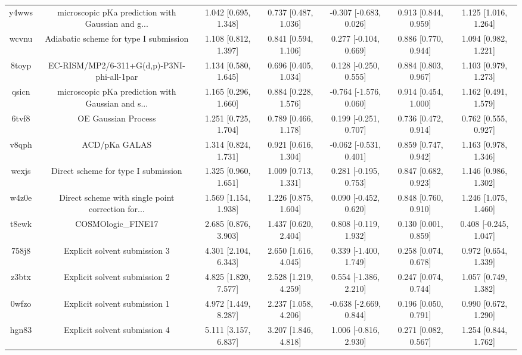 \documentclass{article}
\begin{document}
\begin{center}
\begin{longtable}{|ccccccc|}
 y4wws &  microscopic pKa prediction with Gaussian and g... &  1.042 [0.695, 1.348] &  0.737 [0.487, 1.036] &  -0.307 [-0.683, 0.026] &  0.913 [0.844, 0.959] &   1.125 [1.016, 1.264] \\
 wcvnu &             Adiabatic scheme for type I submission &  1.108 [0.812, 1.397] &  0.841 [0.594, 1.106] &   0.277 [-0.104, 0.669] &  0.886 [0.770, 0.944] &   1.094 [0.982, 1.221] \\
 8toyp &         EC-RISM/MP2/6-311+G(d,p)-P3NI-phi-all-1par &  1.134 [0.580, 1.645] &  0.696 [0.405, 1.034] &   0.128 [-0.250, 0.555] &  0.884 [0.803, 0.967] &   1.103 [0.979, 1.273] \\
 qsicn &  microscopic pKa prediction with Gaussian and s... &  1.165 [0.296, 1.660] &  0.884 [0.228, 1.576] &  -0.764 [-1.576, 0.060] &  0.914 [0.454, 1.000] &   1.162 [0.491, 1.579] \\
 6tvf8 &                                OE Gaussian Process &  1.251 [0.725, 1.704] &  0.789 [0.466, 1.178] &   0.199 [-0.251, 0.707] &  0.736 [0.472, 0.914] &   0.762 [0.555, 0.927] \\
 v8qph &                                      ACD/pKa GALAS &  1.314 [0.824, 1.731] &  0.921 [0.616, 1.304] &  -0.062 [-0.531, 0.401] &  0.859 [0.747, 0.942] &   1.163 [0.978, 1.346] \\
 wexjs &                Direct scheme for type I submission &  1.325 [0.960, 1.651] &  1.009 [0.713, 1.331] &   0.281 [-0.195, 0.753] &  0.847 [0.682, 0.923] &   1.146 [0.986, 1.302] \\
 w4z0e &  Direct scheme with single point correction for... &  1.569 [1.154, 1.938] &  1.226 [0.875, 1.604] &   0.090 [-0.452, 0.620] &  0.848 [0.760, 0.910] &   1.246 [1.075, 1.460] \\
 t8ewk &                                 COSMOlogic\_FINE17 &  2.685 [0.876, 3.903] &  1.437 [0.620, 2.404] &   0.808 [-0.119, 1.932] &  0.130 [0.001, 0.859] &  0.408 [-0.245, 1.047] \\
 758j8 &                      Explicit solvent submission 3 &  4.301 [2.104, 6.343] &  2.650 [1.616, 4.045] &   0.339 [-1.400, 1.749] &  0.258 [0.074, 0.678] &   0.972 [0.654, 1.339] \\
 z3btx &                      Explicit solvent submission 2 &  4.825 [1.820, 7.577] &  2.528 [1.219, 4.259] &   0.554 [-1.386, 2.210] &  0.247 [0.074, 0.744] &   1.057 [0.749, 1.382] \\
 0wfzo &                      Explicit solvent submission 1 &  4.972 [1.449, 8.287] &  2.237 [1.058, 4.206] &  -0.638 [-2.669, 0.844] &  0.196 [0.050, 0.791] &   0.990 [0.672, 1.290] \\
 hgn83 &                      Explicit solvent submission 4 &  5.111 [3.157, 6.837] &  3.207 [1.846, 4.818] &   1.006 [-0.816, 2.930] &  0.271 [0.082, 0.567] &   1.254 [0.844, 1.762] \\
\end{longtable}
\end{center}
\end{document}
